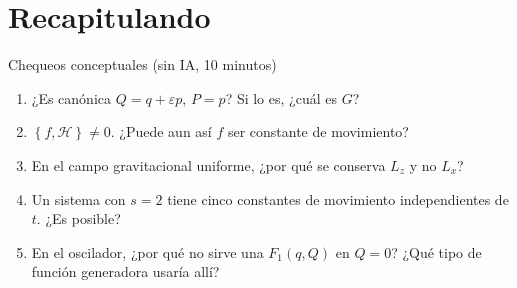 \documentclass[spanish]{beamer}
\newcommand{\Ham}{\mathcal{H}}
\newcommand{\pb}[2]{\left\{#1,#2\right\}}   %
\begin{document}
\section{Recapitulando}

\begin{frame}{Chequeos conceptuales (sin IA, 10 minutos)}
\begin{enumerate}
  \item<1-> ¿Es canónica $Q = q + \varepsilon p$, $P = p$? Si lo es, ¿cuál es $G$?
  \item<2-> $\pb{f}{\Ham}\neq 0$. ¿Puede aun así $f$ ser constante de movimiento?
  \item<3-> En el campo gravitacional uniforme, ¿por qué se conserva $L_z$ y no $L_x$?
  \item<4-> Un sistema con $s=2$ tiene cinco constantes de movimiento independientes de
        $t$. ¿Es posible?
  \item<5-> En el oscilador, ¿por qué no sirve una $F_1(q,Q)$ en $Q = 0$? ¿Qué tipo de
        función generadora usaría allí?
\end{enumerate}
\end{frame}
\end{document}
